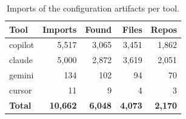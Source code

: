 \begin{table}[t]
\centering
\caption{Imports of the configuration artifacts per tool.}
\label{tab:imports}
\begin{tabular}{lrrrr}
\toprule
\textbf{Tool} & \textbf{Imports} & \textbf{Found} & \textbf{Files} & \textbf{Repos} \\
\midrule
copilot & 5,517 & 3,065 & 3,451 & 1,862 \\
claude & 5,000 & 2,872 & 3,619 & 2,051 \\
gemini & 134 & 102 & 94 & 70 \\
cursor & 11 & 9 & 4 & 3 \\
\midrule
\textbf{Total} & \textbf{10,662} & \textbf{6,048} & \textbf{4,073} & \textbf{2,170} \\
\bottomrule
\end{tabular}
\end{table}
